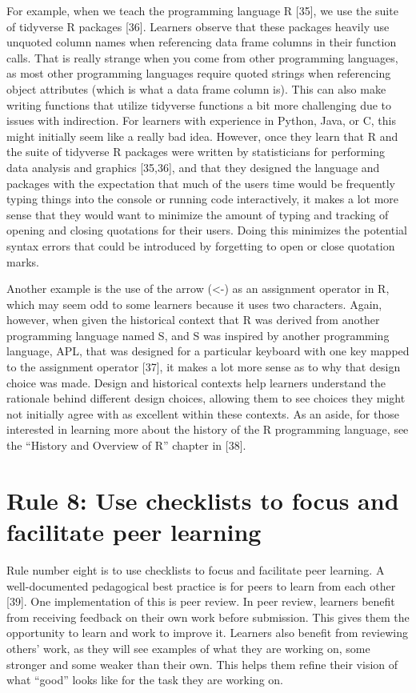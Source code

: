 \documentclass[
  10pt,
  letterpaper,
]{article}
\begin{document}
For example, when we teach the programming language R {[}35{]}, we use
the suite of tidyverse R packages {[}36{]}. Learners observe that these
packages heavily use unquoted column names when referencing data frame
columns in their function calls. That is really strange when you come
from other programming languages, as most other programming languages
require quoted strings when referencing object attributes (which is what
a data frame column is). This can also make writing functions that
utilize tidyverse functions a bit more challenging due to issues with
indirection. For learners with experience in Python, Java, or C, this
might initially seem like a really bad idea. However, once they learn
that R and the suite of tidyverse R packages were written by
statisticians for performing data analysis and graphics {[}35,36{]}, and
that they designed the language and packages with the expectation that
much of the users time would be frequently typing things into the
console or running code interactively, it makes a lot more sense that
they would want to minimize the amount of typing and tracking of opening
and closing quotations for their users. Doing this minimizes the
potential syntax errors that could be introduced by forgetting to open
or close quotation marks.

Another example is the use of the arrow (\textless-) as an assignment
operator in R, which may seem odd to some learners because it uses two
characters. Again, however, when given the historical context that R was
derived from another programming language named S, and S was inspired by
another programming language, APL, that was designed for a particular
keyboard with one key mapped to the assignment operator {[}37{]}, it
makes a lot more sense as to why that design choice was made. Design and
historical contexts help learners understand the rationale behind
different design choices, allowing them to see choices they might not
initially agree with as excellent within these contexts. As an aside,
for those interested in learning more about the history of the R
programming language, see the ``History and Overview of R'' chapter in
{[}38{]}.

\section{Rule 8: Use checklists to focus and facilitate peer
learning}\label{sec-rule8}

Rule number eight is to use checklists to focus and facilitate peer
learning. A well-documented pedagogical best practice is for peers to
learn from each other {[}39{]}. One implementation of this is peer
review. In peer review, learners benefit from receiving feedback on
their own work before submission. This gives them the opportunity to
learn and work to improve it. Learners also benefit from reviewing
others' work, as they will see examples of what they are working on,
some stronger and some weaker than their own. This helps them refine
their vision of what ``good'' looks like for the task they are working
on.
\end{document}
